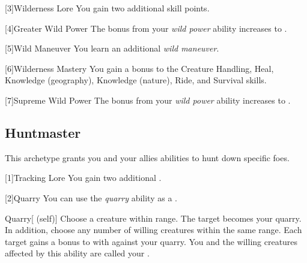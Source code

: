        [3]{Wilderness Lore} You gain two additional skill points.

        [4]{Greater Wild Power} The bonus from your \textit{wild power} ability increases to .

        [5]{Wild Maneuver}
        You learn an additional \textit{wild maneuver}.

        [6]{Wilderness Mastery} You gain a  bonus to the Creature Handling, Heal, Knowledge (geography), Knowledge (nature), Ride, and Survival skills.

        [7]{Supreme Wild Power} The bonus from your \textit{wild power} ability increases to .

    \subsection{Huntmaster}
        This archetype grants you and your allies abilities to hunt down specific foes.

        [1]{Tracking Lore}
        You gain two additional .

        [2]{Quarry}\label{Quarry} You can use the \textit{quarry} ability as a .
        \begin{attuneability}{Quarry}[ (self)]
            Choose a creature within \rnglong range.
            The target becomes your quarry.
            In addition, choose any number of willing creatures within the same range.
            Each target gains a  bonus to  with  against your quarry.
            You and the willing creatures affected by this ability are called your .
        \end{attuneability}

